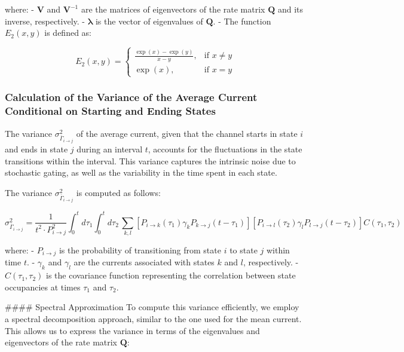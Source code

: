 \documentclass[pdflatex,sn-mathphys-num]{sn-jnl}%
\theoremstyle{thmstyleone}%
\theoremstyle{thmstyletwo}%
\theoremstyle{thmstylethree}%
\begin{document}
where:
- \( \mathbf{V} \) and \( \mathbf{V}^{-1} \) are the matrices of eigenvectors of the rate matrix \( \mathbf{Q} \) and its inverse, respectively.
- \( \boldsymbol{\lambda} \) is the vector of eigenvalues of \( \mathbf{Q} \).
- The function \( E_2(x, y) \) is defined as:

\begin{equation}
	E_2(x, y) = 
	\begin{cases}
		\frac{\exp(x) - \exp(y)}{x - y}, & \text{if } x \neq y \\
		\exp(x), & \text{if } x = y
	\end{cases}
    \label{eq:E_2}
\end{equation}


\subsubsection{Calculation of the Variance of the Average Current Conditional on Starting and Ending States}

The variance \( \sigma^2_{\overline{\Gamma}_{i \rightarrow j}} \) of the average current, given that the channel starts in state \( i \) and ends in state \( j \) during an interval \( t \), accounts for the fluctuations in the state transitions within the interval. This variance captures the intrinsic noise due to stochastic gating, as well as the variability in the time spent in each state.

The variance \( \sigma^2_{\overline{\Gamma}_{i \rightarrow j}} \) is computed as follows:

\begin{equation}
	\sigma^2_{\overline{\Gamma}_{i \rightarrow j}} = \frac{1}{t^2 \cdot P_{i \rightarrow j}^2} \int_0^t d\tau_1 \int_0^t d\tau_2 \, \sum_{k, l} \left[ P_{i \rightarrow k}(\tau_1) \gamma_k P_{k \rightarrow j}(t-\tau_1) \right] \left[ P_{i \rightarrow l}(\tau_2) \gamma_l P_{l \rightarrow j}(t-\tau_2) \right] C(\tau_1, \tau_2)
\end{equation}

where:
- \( P_{i \rightarrow j} \) is the probability of transitioning from state \( i \) to state \( j \) within time \( t \).
- \( \gamma_k \) and \( \gamma_l \) are the currents associated with states \( k \) and \( l \), respectively.
- \( C(\tau_1, \tau_2) \) is the covariance function representing the correlation between state occupancies at times \( \tau_1 \) and \( \tau_2 \).

#### Spectral Approximation
To compute this variance efficiently, we employ a spectral decomposition approach, similar to the one used for the mean current. This allows us to express the variance in terms of the eigenvalues and eigenvectors of the rate matrix \( \mathbf{Q} \):
\end{document}
